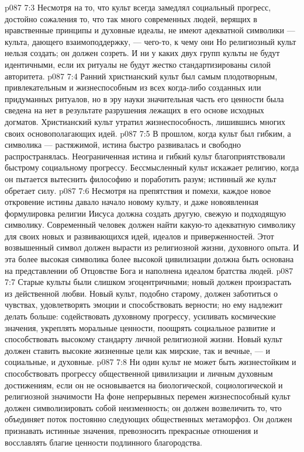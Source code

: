 \vs p087 7:3 Несмотря на то, что культ всегда замедлял социальный прогресс, достойно сожаления то, что так много современных людей, верящих в нравственные принципы и духовные идеалы, не имеют адекватной символики --- культа, дающего взаимоподдержку, --- чего\hyp{}то, к чему они  Но религиозный культ нельзя создать; он должен созреть. И ни у каких двух групп культы не будут идентичными, если их ритуалы не будут жестко стандартизированы силой авторитета.
\vs p087 7:4 Ранний христианский культ был самым плодотворным, привлекательным и жизнеспособным из всех когда\hyp{}либо созданных или придуманных ритуалов, но в эру науки значительная часть его ценности была сведена на нет в результате разрушения лежащих в его основе исходных догматов. Христианский культ утратил жизнеспособность, лишившись многих своих основополагающих идей.
\vs p087 7:5 \pc В прошлом, когда культ был гибким, а символика --- растяжимой, истина быстро развивалась и свободно распространялась. Неограниченная истина и гибкий культ благоприятствовали быстрому социальному прогрессу. Бессмысленный культ искажает религию, когда он пытается вытеснить философию и поработить разум; истинный же культ обретает силу.
\vs p087 7:6 \pc Несмотря на препятствия и помехи, каждое новое откровение истины давало начало новому культу, и даже новоявленная формулировка религии Иисуса должна создать другую, свежую и подходящую символику. Современный человек должен найти какую\hyp{}то адекватную символику для своих новых и развивающихся идей, идеалов и приверженностей. Этот возвышенный символ должен вырасти из религиозной жизни, духовного опыта. И эта более высокая символика более высокой цивилизации должна быть основана на представлении об Отцовстве Бога и наполнена идеалом братства людей.
\vs p087 7:7 Старые культы были слишком эгоцентричными; новый должен произрастать из действенной любви. Новый культ, подобно старому, должен заботиться о чувствах, удовлетворять эмоции и способствовать верности; но ему надлежит делать больше: содействовать духовному прогрессу, усиливать космические значения, укреплять моральные ценности, поощрять социальное развитие и способствовать высокому стандарту личной религиозной жизни. Новый культ должен ставить высокие жизненные цели как мирские, так и вечные, --- и социальные, и духовные.
\vs p087 7:8 Ни один культ не может быть жизнестойким и способствовать прогрессу общественной цивилизации и личным духовным достижениям, если он не основывается на биологической, социологической и религиозной значимости  На фоне непрерывных перемен жизнеспособный культ должен символизировать собой неизменность; он должен возвеличить то, что объединяет поток постоянно следующих общественных метаморфоз. Он должен признавать истинные значения, превозносить прекрасные отношения и восславлять благие ценности подлинного благородства.
